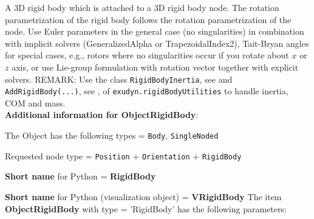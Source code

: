 %
\newpage

\label{sec:item:ObjectRigidBody}
A 3D rigid body which is attached to a 3D rigid body node. The rotation parametrization of the rigid body follows the rotation parametrization of the node. Use Euler parameters in the general case (no singularities) in combination with implicit solvers (GeneralizedAlpha or TrapezoidalIndex2), Tait-Bryan angles for special cases, e.g., rotors where no singularities occur if you rotate about $x$ or $z$ axis, or use Lie-group formulation with rotation vector together with explicit solvers. REMARK: Use the class \texttt{RigidBodyInertia}, see  and \texttt{AddRigidBody(...)}, see , of \texttt{exudyn.rigidBodyUtilities} to handle inertia, COM and mass.\vspace{12pt}
 \\{\bf Additional information for ObjectRigidBody}:
\bi
  \item The Object has the following types = \texttt{Body}, \texttt{SingleNoded}
  \item Requested node type = \texttt{Position} + \texttt{Orientation} + \texttt{RigidBody}
  \item {\bf Short name} for Python = {\bf RigidBody}  \item {\bf Short name} for Python (visualization object) = {\bf VRigidBody}\ei
\vspace{12pt} \noindent The item {\bf ObjectRigidBody} with type = 'RigidBody' has the following parameters:\vspace{-1cm}\\ 
